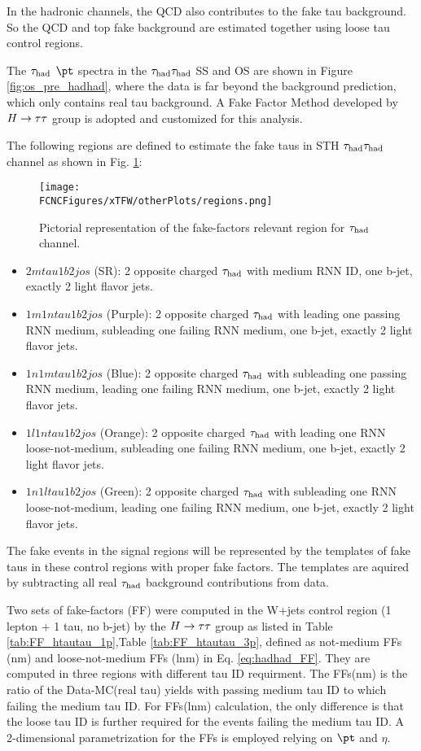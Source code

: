 In the hadronic channels, the QCD also contributes to the fake tau background. So the QCD and top fake background are estimated together using loose tau control regions.

The $\tau_\text{had}$ $\pt$ spectra in the $\tau_\text{had}{}\tau_\text{had}$ SS and OS are shown in Figure \ref{fig:os_pre_hadhad}, where the data is far beyond the background prediction, which only contains real tau background. A Fake Factor Method developed by $H \rightarrow \tau\tau$ group \cite{Htautau-note} is adopted and customized for this analysis. 

The following regions are defined to estimate the fake taus in STH $\tau_\text{had}{}\tau_\text{had}$ channel as shown in Fig. \ref{fig:regions_hadhad}:

\begin{figure}[htb]
\centering
\texttt{[image: \\FCNCFigures/xTFW/otherPlots/regions.png]}
\caption{Pictorial representation of the fake-factors relevant region for $\tau_\text{had}$ channel.}
\label{fig:regions_hadhad}
\end{figure}

\begin{itemize}
\item{$2mtau1b2jos$ (SR): 2 opposite charged $\tau_\text{had}$ with medium RNN ID, one b-jet, exactly 2 light flavor jets.}
\item{$1m1ntau1b2jos$ (Purple): 2 opposite charged $\tau_\text{had}$ with leading one passing RNN medium, subleading one failing RNN medium, one b-jet, exactly 2 light flavor jets.}
\item{$1n1mtau1b2jos$ (Blue): 2 opposite charged $\tau_\text{had}$ with subleading one passing RNN medium, leading one failing RNN medium, one b-jet, exactly 2 light flavor jets.}
\item{$1l1ntau1b2jos$ (Orange): 2 opposite charged $\tau_\text{had}$ with leading one RNN loose-not-medium, subleading one failing RNN medium, one b-jet, exactly 2 light flavor jets.}
\item{$1n1ltau1b2jos$ (Green): 2 opposite charged $\tau_\text{had}$ with subleading one RNN loose-not-medium, leading one failing RNN medium, one b-jet, exactly 2 light flavor jets.}
\end{itemize}

The fake events in the signal regions will be represented by the templates of fake taus in these control regions with proper fake factors. The templates are aquired by subtracting all real $\tau_\text{had}$ background contributions from data.

Two sets of fake-factors (FF) were computed in the W+jets control region (1 lepton + 1 tau, no b-jet) by the $H \rightarrow \tau\tau$ group \cite{Htautau-note} as listed in Table \ref{tab:FF_htautau_1p},Table \ref{tab:FF_htautau_3p}, defined as not-medium FFs (nm) and loose-not-medium FFs (lnm) in Eq. \ref{eq:hadhad_FF}. They are computed in three regions with different tau ID requirment. The FFs(nm) is the ratio of the Data-MC(real tau) yields with passing medium tau ID to which failing the medium tau ID. For FFs(lnm) calculation, the only difference is that the loose tau ID is further required for the events failing the medium tau ID. A 2-dimensional parametrization for the FFs is employed relying on $\pt$ and $\eta$.

